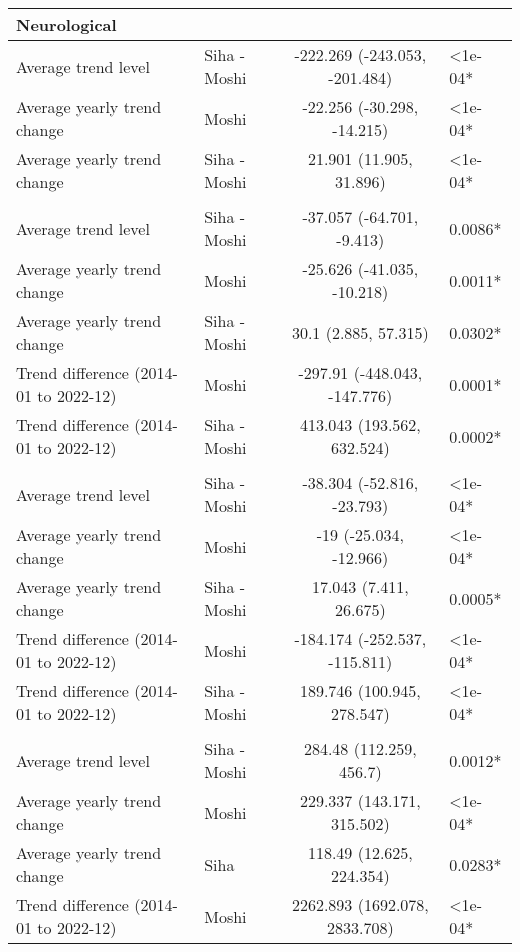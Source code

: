 \begin{longtable}{l|lcl}
\multicolumn{4}{l}{Neurological} \\ 
\midrule\addlinespace[2.5pt]
Average trend level & Siha - Moshi & -222.269 (-243.053, -201.484) & <1e-04* \\ 
Average yearly trend change & Moshi & -22.256 (-30.298, -14.215) & <1e-04* \\ 
Average yearly trend change & Siha - Moshi & 21.901 (11.905, 31.896) & <1e-04* \\ 
\midrule\addlinespace[2.5pt]
\multicolumn{4}{l}{Other Non-Communicable} \\ 
\midrule\addlinespace[2.5pt]
Average trend level & Siha - Moshi & -37.057 (-64.701, -9.413) & 0.0086* \\ 
Average yearly trend change & Moshi & -25.626 (-41.035, -10.218) & 0.0011* \\ 
Average yearly trend change & Siha - Moshi & 30.1 (2.885, 57.315) & 0.0302* \\ 
Trend difference (2014-01 to 2022-12) & Moshi & -297.91 (-448.043, -147.776) & 0.0001* \\ 
Trend difference (2014-01 to 2022-12) & Siha - Moshi & 413.043 (193.562, 632.524) & 0.0002* \\ 
\midrule\addlinespace[2.5pt]
\multicolumn{4}{l}{Respiratory Diseases} \\ 
\midrule\addlinespace[2.5pt]
Average trend level & Siha - Moshi & -38.304 (-52.816, -23.793) & <1e-04* \\ 
Average yearly trend change & Moshi & -19 (-25.034, -12.966) & <1e-04* \\ 
Average yearly trend change & Siha - Moshi & 17.043 (7.411, 26.675) & 0.0005* \\ 
Trend difference (2014-01 to 2022-12) & Moshi & -184.174 (-252.537, -115.811) & <1e-04* \\ 
Trend difference (2014-01 to 2022-12) & Siha - Moshi & 189.746 (100.945, 278.547) & <1e-04* \\ 
\midrule\addlinespace[2.5pt]
\multicolumn{4}{l}{Respiratory Infections} \\ 
\midrule\addlinespace[2.5pt]
Average trend level & Siha - Moshi & 284.48 (112.259, 456.7) & 0.0012* \\ 
Average yearly trend change & Moshi & 229.337 (143.171, 315.502) & <1e-04* \\ 
Average yearly trend change & Siha & 118.49 (12.625, 224.354) & 0.0283* \\ 
Trend difference (2014-01 to 2022-12) & Moshi & 2262.893 (1692.078, 2833.708) & <1e-04* \\ 

\end{longtable}

